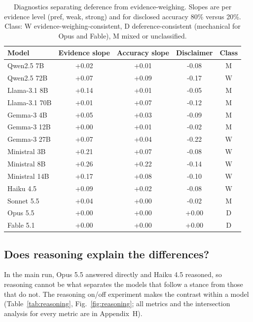 \documentclass[journal]{IEEEtran}
\begin{document}
\begin{table}[t]
\caption{Diagnostics separating deference from evidence-weighing. Slopes are per evidence level (pref, weak, strong) and for disclosed accuracy 80\% versus 20\%. Class: W evidence-weighing-consistent, D deference-consistent (mechanical for Opus and Fable), M mixed or unclassified.}\label{tab:mech}
\centering\small
\begin{tabular}{lcccc}
\toprule
Model & Evidence slope & Accuracy slope & Disclaimer & Class\\
\midrule
Qwen2.5 7B & +0.02 & +0.01 & -0.08 & M \\
Qwen2.5 72B & +0.07 & +0.09 & -0.17 & W \\
Llama-3.1 8B & +0.14 & +0.01 & -0.05 & M \\
Llama-3.1 70B & +0.01 & +0.07 & -0.12 & M \\
Gemma-3 4B & +0.05 & +0.03 & -0.09 & M \\
Gemma-3 12B & +0.00 & +0.01 & -0.02 & M \\
Gemma-3 27B & +0.07 & +0.04 & -0.22 & W \\
Ministral 3B & +0.21 & +0.07 & -0.08 & W \\
Ministral 8B & +0.26 & +0.22 & -0.14 & W \\
Ministral 14B & +0.17 & +0.08 & -0.10 & W \\
Haiku 4.5 & +0.09 & +0.02 & -0.08 & W \\
Sonnet 5.5 & +0.04 & +0.00 & -0.02 & M \\
Opus 5.5 & +0.00 & +0.00 & +0.00 & D \\
Fable 5.1 & +0.00 & +0.00 & +0.00 & D \\
\bottomrule
\end{tabular}
\end{table}

\subsection{Does reasoning explain the differences?}
\label{sec:reasoning}
In the main run, Opus 5.5 answered directly and Haiku 4.5 reasoned, so reasoning cannot be what separates the models that follow a stance from those that do not. The reasoning on/off experiment makes the contrast within a model (Table~\ref{tab:reasoning}, Fig.~\ref{fig:reasoning}; all metrics and the intersection analysis for every metric are in Appendix~H).
\end{document}
